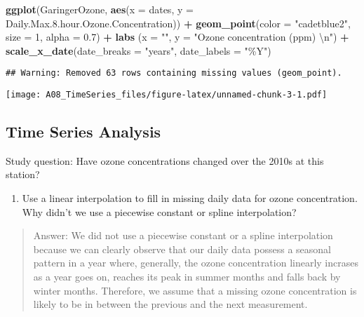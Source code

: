 \documentclass[
]{article}
\newenvironment{Shaded}{\begin{snugshade}}{\end{snugshade}}
\newcommand{\CharTok}[1]{\textcolor[rgb]{0.31,0.60,0.02}{#1}}
\newcommand{\DataTypeTok}[1]{\textcolor[rgb]{0.13,0.29,0.53}{#1}}
\newcommand{\DecValTok}[1]{\textcolor[rgb]{0.00,0.00,0.81}{#1}}
\newcommand{\FloatTok}[1]{\textcolor[rgb]{0.00,0.00,0.81}{#1}}
\newcommand{\KeywordTok}[1]{\textcolor[rgb]{0.13,0.29,0.53}{\textbf{#1}}}
\newcommand{\NormalTok}[1]{#1}
\newcommand{\OperatorTok}[1]{\textcolor[rgb]{0.81,0.36,0.00}{\textbf{#1}}}
\newcommand{\StringTok}[1]{\textcolor[rgb]{0.31,0.60,0.02}{#1}}
\providecommand{\tightlist}{%
  \setlength{\itemsep}{0pt}\setlength{\parskip}{0pt}}
\begin{document}
\begin{Shaded}
\begin{Highlighting}[]
\KeywordTok{ggplot}\NormalTok{(GaringerOzone, }
       \KeywordTok{aes}\NormalTok{(}\DataTypeTok{x =}\NormalTok{ dates, }\DataTypeTok{y =}\NormalTok{ Daily.Max.}\FloatTok{8.}\NormalTok{hour.Ozone.Concentration)) }\OperatorTok{+}
\StringTok{  }\KeywordTok{geom\_point}\NormalTok{(}\DataTypeTok{color =} \StringTok{"cadetblue2"}\NormalTok{, }\DataTypeTok{size =} \DecValTok{1}\NormalTok{, }\DataTypeTok{alpha =} \FloatTok{0.7}\NormalTok{) }\OperatorTok{+}
\StringTok{  }\KeywordTok{labs}\NormalTok{ (}\DataTypeTok{x =} \StringTok{""}\NormalTok{, }\DataTypeTok{y =} \StringTok{"Ozone concentration (ppm) }\CharTok{\textbackslash{}n}\StringTok{"}\NormalTok{) }\OperatorTok{+}
\StringTok{  }\KeywordTok{scale\_x\_date}\NormalTok{(}\DataTypeTok{date\_breaks =} \StringTok{"years"}\NormalTok{, }\DataTypeTok{date\_labels =} \StringTok{"\%Y"}\NormalTok{)}
\end{Highlighting}
\end{Shaded}

\begin{verbatim}
## Warning: Removed 63 rows containing missing values (geom_point).
\end{verbatim}

\texttt{[image: A08\_TimeSeries\_files/figure-latex/unnamed-chunk-3-1.pdf]}

\hypertarget{time-series-analysis}{%
\subsection{Time Series Analysis}\label{time-series-analysis}}

Study question: Have ozone concentrations changed over the 2010s at this
station?

\begin{enumerate}
\def\labelenumi{\arabic{enumi}.}
\setcounter{enumi}{7}
\tightlist
\item
  Use a linear interpolation to fill in missing daily data for ozone
  concentration. Why didn't we use a piecewise constant or spline
  interpolation?
\end{enumerate}

\begin{quote}
Answer: We did not use a piecewise constant or a spline interpolation
because we can clearly observe that our daily data possess a seasonal
pattern in a year where, generally, the ozone concentration linearly
incrases as a year goes on, reaches its peak in summer months and falls
back by winter months. Therefore, we assume that a missing ozone
concentration is likely to be in between the previous and the next
measurement.
\end{quote}
\end{document}
